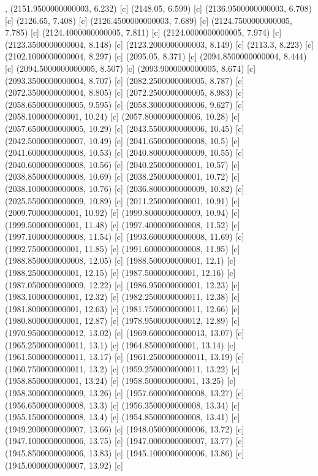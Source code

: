 {{{},{
(2151.9500000000003, 6.232) [c] 
(2148.05, 6.599) [c] 
(2136.9500000000003, 6.708) [c] 
(2126.65, 7.408) [c] 
(2126.4500000000003, 7.689) [c] 
(2124.7500000000005, 7.785) [c] 
(2124.4000000000005, 7.811) [c] 
(2124.0000000000005, 7.974) [c] 
(2123.3500000000004, 8.148) [c] 
(2123.2000000000003, 8.149) [c] 
(2113.3, 8.223) [c] 
(2102.1000000000004, 8.297) [c] 
(2095.05, 8.371) [c] 
(2094.8500000000004, 8.444) [c] 
(2094.5000000000005, 8.507) [c] 
(2093.9000000000005, 8.674) [c] 
(2093.3500000000004, 8.707) [c] 
(2082.2500000000005, 8.787) [c] 
(2072.3500000000004, 8.805) [c] 
(2072.2500000000005, 8.983) [c] 
(2058.6500000000005, 9.595) [c] 
(2058.3000000000006, 9.627) [c] 
(2058.100000000001, 10.24) [c] 
(2057.8000000000006, 10.28) [c] 
(2057.6500000000005, 10.29) [c] 
(2043.5500000000006, 10.45) [c] 
(2042.5000000000007, 10.49) [c] 
(2041.6500000000008, 10.5) [c] 
(2041.6000000000008, 10.53) [c] 
(2040.8000000000009, 10.55) [c] 
(2040.6000000000008, 10.56) [c] 
(2040.250000000001, 10.57) [c] 
(2038.8500000000008, 10.69) [c] 
(2038.250000000001, 10.72) [c] 
(2038.1000000000008, 10.76) [c] 
(2036.8000000000009, 10.82) [c] 
(2025.5500000000009, 10.89) [c] 
(2011.250000000001, 10.91) [c] 
(2009.700000000001, 10.92) [c] 
(1999.8000000000009, 10.94) [c] 
(1999.500000000001, 11.48) [c] 
(1997.4000000000008, 11.52) [c] 
(1997.1000000000008, 11.54) [c] 
(1993.6000000000008, 11.69) [c] 
(1992.750000000001, 11.85) [c] 
(1991.6000000000008, 11.95) [c] 
(1988.8500000000008, 12.05) [c] 
(1988.500000000001, 12.1) [c] 
(1988.250000000001, 12.15) [c] 
(1987.500000000001, 12.16) [c] 
(1987.0500000000009, 12.22) [c] 
(1986.950000000001, 12.23) [c] 
(1983.100000000001, 12.32) [c] 
(1982.2500000000011, 12.38) [c] 
(1981.800000000001, 12.63) [c] 
(1981.7500000000011, 12.66) [c] 
(1980.800000000001, 12.87) [c] 
(1978.9500000000012, 12.89) [c] 
(1970.9500000000012, 13.02) [c] 
(1969.6000000000013, 13.07) [c] 
(1965.2500000000011, 13.1) [c] 
(1964.850000000001, 13.14) [c] 
(1961.5000000000011, 13.17) [c] 
(1961.2500000000011, 13.19) [c] 
(1960.7500000000011, 13.2) [c] 
(1959.2500000000011, 13.22) [c] 
(1958.850000000001, 13.24) [c] 
(1958.500000000001, 13.25) [c] 
(1958.3000000000009, 13.26) [c] 
(1957.6000000000008, 13.27) [c] 
(1956.6500000000008, 13.3) [c] 
(1956.3500000000008, 13.34) [c] 
(1955.1500000000008, 13.4) [c] 
(1954.8500000000008, 13.41) [c] 
(1949.2000000000007, 13.66) [c] 
(1948.0500000000006, 13.72) [c] 
(1947.1000000000006, 13.75) [c] 
(1947.0000000000007, 13.77) [c] 
(1945.8500000000006, 13.83) [c] 
(1945.1000000000006, 13.86) [c] 
(1945.0000000000007, 13.92) [c] 
}}}

